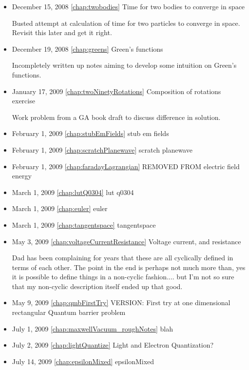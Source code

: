 \begin{itemize}
\item December 15, 2008 \ref{chap:twobodies} Time for two bodies to converge in space

Busted attempt at calculation of time for two particles to converge in space.  Revisit this later and get it right.\item December 19, 2008 \ref{chap:greens} Green's functions

Incompletely written up notes aiming to develop some intuition on Green's functions.\item January 17, 2009 \ref{chap:twoNinetyRotations} Composition of rotations exercise

Work problem from a GA book draft to discuss difference in solution. \item February 1, 2009 \ref{chap:stubEmFields} stub em fields

\item February 1, 2009 \ref{chap:scratchPlanewave} scratch planewave

\item February 1, 2009 \ref{chap:faradayLagrangian} REMOVED FROM electric field energy

\item March 1, 2009 \ref{chap:lutQ0304} lut q0304

\item March 1, 2009 \ref{chap:euler} euler

\item March 1, 2009 \ref{chap:tangentspace} tangentspace

\item May 3, 2009 \ref{chap:voltageCurrentResistance} Voltage current, and resistance

Dad has been complaining for years that these are all cyclically defined in terms of each other.  The point in the end is perhaps not much more than, yes it is possible to define things in a non-cyclic fashion.... but I'm not so sure that my non-cyclic description itself ended up that good. \item May 9, 2009 \ref{chap:qmbFirstTry} VERSION: First try at one dimensional rectangular Quantum barrier problem

\item July 1, 2009 \ref{chap:maxwellVacuum_roughNotes} blah

\item July 2, 2009 \ref{chap:lightQuantize} Light and Electron Quantization?

\item July 14, 2009 \ref{chap:epsilonMixed} epsilonMixed


\end{itemize}

